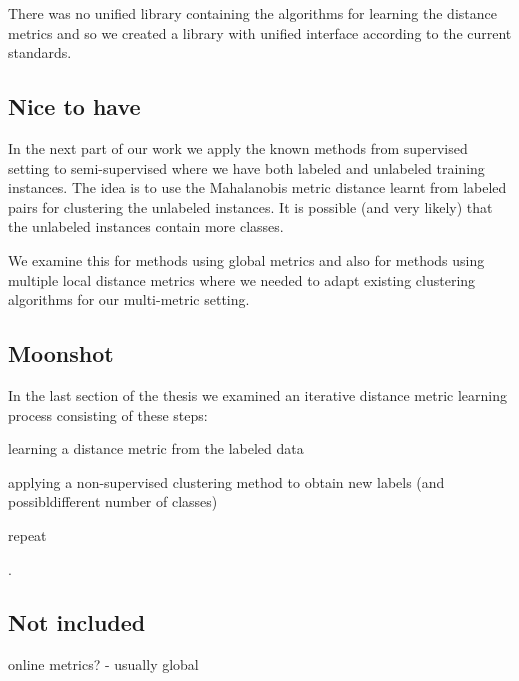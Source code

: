 \documentclass[12pt,a4paper]{report}
\begin{document}
There was no unified library containing the algorithms for learning the distance metrics and so we created a library with unified interface according to the current standards.

\subsection{Nice to have}

In the next part of our work we apply the known methods from supervised setting to semi-supervised where we have both labeled and unlabeled training instances. The idea is to use the Mahalanobis metric distance learnt from labeled pairs for clustering the unlabeled instances. It is possible (and very likely) that the unlabeled instances contain more classes.

We examine this for methods using global metrics and also for methods using multiple local distance metrics where we needed to adapt existing clustering algorithms for our multi-metric setting.

\subsection{Moonshot}

In the last section of the thesis we examined an iterative distance metric learning process consisting of these steps:
\begin{enumerate*}
\item{learning a distance metric from the labeled data}
\item{applying a non-supervised clustering method to obtain new labels (and possibldifferent number of classes)}
\item{repeat}
\end{enumerate*}
.

\subsection{Not included}

online metrics? - usually global




\listoffigures
\end{document}
